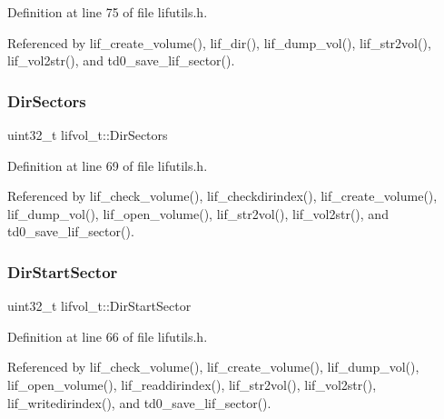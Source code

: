 Definition at line 75 of file lifutils.\+h.



Referenced by lif\+\_\+create\+\_\+volume(), lif\+\_\+dir(), lif\+\_\+dump\+\_\+vol(), lif\+\_\+str2vol(), lif\+\_\+vol2str(), and td0\+\_\+save\+\_\+lif\+\_\+sector().

\mbox{\label{structlifvol__t_aceac3bc67cda1f79d91c002411e33897}} 
\subsubsection{\texorpdfstring{Dir\+Sectors}{DirSectors}}
{\footnotesize\ttfamily uint32\+\_\+t lifvol\+\_\+t\+::\+Dir\+Sectors}



Definition at line 69 of file lifutils.\+h.



Referenced by lif\+\_\+check\+\_\+volume(), lif\+\_\+checkdirindex(), lif\+\_\+create\+\_\+volume(), lif\+\_\+dump\+\_\+vol(), lif\+\_\+open\+\_\+volume(), lif\+\_\+str2vol(), lif\+\_\+vol2str(), and td0\+\_\+save\+\_\+lif\+\_\+sector().

\mbox{\label{structlifvol__t_a89b86c990a7843cfa2addfff9a775137}} 
\subsubsection{\texorpdfstring{Dir\+Start\+Sector}{DirStartSector}}
{\footnotesize\ttfamily uint32\+\_\+t lifvol\+\_\+t\+::\+Dir\+Start\+Sector}



Definition at line 66 of file lifutils.\+h.



Referenced by lif\+\_\+check\+\_\+volume(), lif\+\_\+create\+\_\+volume(), lif\+\_\+dump\+\_\+vol(), lif\+\_\+open\+\_\+volume(), lif\+\_\+readdirindex(), lif\+\_\+str2vol(), lif\+\_\+vol2str(), lif\+\_\+writedirindex(), and td0\+\_\+save\+\_\+lif\+\_\+sector().

\mbox{\label{structlifvol__t_abbccb2f637812a31d24aa1f6725194be}} 
